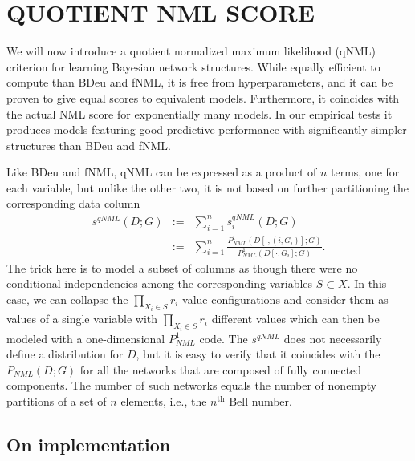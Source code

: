\documentclass[letterpaper]{article}
\begin{document}
\section{QUOTIENT NML SCORE}

We will now introduce a quotient normalized maximum likelihood (qNML)
criterion for learning Bayesian network structures.  While equally
efficient to compute than BDeu and fNML, it is free from
hyperparameters, and it can be proven to give equal scores to
equivalent models. Furthermore, it coincides with the actual NML score
for exponentially many models. In our empirical tests it produces
models featuring good predictive performance with significantly
simpler structures than BDeu and fNML.

Like BDeu and fNML, qNML can be expressed as a product of $n$ terms,
one for each variable, but unlike the other two, it is not based on
further partitioning the corresponding data column
\begin{eqnarray}
s^{qNML}(D;G) & := & \sum_{i=1}^n s^{qNML}_i(D;G)\\
 & := & \sum_{i=1}^n \frac{P^1_{NML}(D[\cdot,(i,G_i)];G)}{P^1_{NML}(D[\cdot,G_i];G)}.\nonumber
\end{eqnarray}
The trick here is to model a subset of columns as though there were no
conditional independencies among the corresponding variables $S
\subset X$.  In this case, we can collapse the $\prod_{X_i\in S} r_i$
value configurations and consider them as values of a single variable
with $\prod_{X_i\in S} r_i$ different values which can then be modeled
with a one-dimensional $P^1_{NML}$ code.  The $s^{qNML}$ does not
necessarily define a distribution for $D$, but it is easy to verify
that it coincides with the $P_{NML}(D;G)$ for all the networks that
are composed of fully connected components.  The number of such
networks equals the number of nonempty partitions of a set of $n$
elements, i.e., the $n^\text{th}$ Bell number.

\subsection {On implementation}
\end{document}

